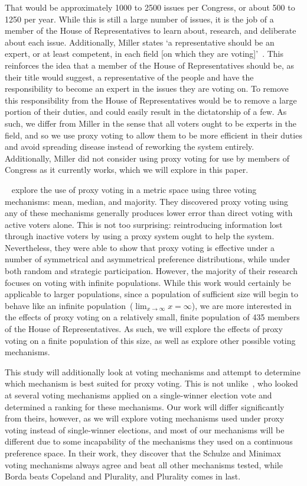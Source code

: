 That would be approximately 1000 to 2500 issues per Congress, or about 500 to 1250 per
year.
While this is still a large number of issues, it is the job of a member of the House
of Representatives to learn about, research, and deliberate about each issue.
Additionally, Miller states `a representative should be an expert, or at least
competent, in each field [on which they are voting]'~\cite{Miller1969}.
This reinforces the idea that a member of the House of Representatives should be, as
their title would suggest, a representative of the people and have the responsibility
to become an expert in the issues they are voting on.
To remove this responsibility from the House of Representatives would be to remove
a large portion of their duties, and could easily result in the dictatorship of a few.
As such, we differ from Miller in the sense that all voters ought to be experts in
the field, and so we use proxy voting to allow them to be more efficient in their
duties and avoid spreading disease instead of reworking the system entirely.
Additionally, Miller did not consider using proxy voting for use by members of
Congress as it currently works, which we will explore in this paper.

~\cite{Cohensius2017} explore the use of proxy voting in a metric space
using three voting mechanisms: mean, median, and majority.
They discovered proxy voting using any of these mechanisms generally produces lower
error than direct voting with active voters alone.
This is not too surprising: reintroducing information lost through inactive voters by
using a proxy system ought to help the system.
Nevertheless, they were able to show that proxy voting is effective under a number of
symmetrical and asymmetrical preference distributions, while under both random and
strategic participation.
However, the majority of their research focuses on voting with infinite populations.
While this work would certainly be applicable to larger populations, since a
population of sufficient size will begin to behave like an infinite
population~($\lim_{x \rightarrow \infty} x = \infty$), we are more interested in the
effects of proxy voting on a relatively small, finite population of 435 members of the
House of Representatives.
As such, we will explore the effects of proxy voting on a finite population of this
size, as well as explore other possible voting mechanisms.

This study will additionally look at voting mechanisms and attempt to determine which
mechanism is best suited for proxy voting.
This is not unlike~\cite{Mathur2017}, who looked at several voting mechanisms applied
on a single-winner election vote and determined a ranking for these mechanisms.
Our work will differ significantly from theirs, however, as we will explore voting
mechanisms used under proxy voting instead of single-winner elections, and most of
our mechanisms will be different due to some incapability of the mechanisms they used
on a continuous preference space.
In their work, they discover that the Schulze and Minimax voting mechanisms always
agree and beat all other mechanisms tested, while Borda beats Copeland and Plurality,
and Plurality comes in last.

